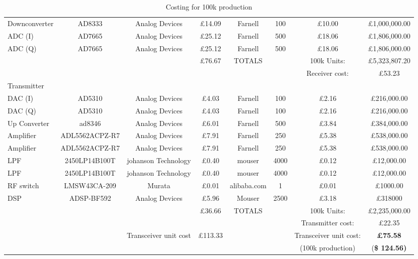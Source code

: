 \begin{sidewaystable}
\begin{tabular}{l c c c c c c c}
Downconverter& AD8333& Analog Devices& \pounds14.09& Farnell& 100& \pounds10.00& \pounds1,000,000.00\\

ADC (I)& AD7665 &Analog Devices& \pounds25.12 &Farnell& 500 &\pounds18.06 &\pounds1,806,000.00\\
ADC (Q)& AD7665 &Analog Devices& \pounds25.12 &Farnell& 500 &\pounds18.06 &\pounds1,806,000.00\\
\midrule %
&&&\pounds76.67 &TOTALS&& 100k Units: &\pounds5,323,807.20\\

&&&&&&Receiver cost:&\pounds53.23\\



Transmitter\\
\midrule
DAC (I)& AD5310 & Analog Devices &\pounds4.03 &Farnell& 100& \pounds 2.16 &\pounds216,000.00\\
DAC (Q)& AD5310 & Analog Devices &\pounds4.03 &Farnell& 100& \pounds 2.16 &\pounds216,000.00\\
Up Converter& ad8346& Analog Devices& \pounds6.01& Farnell& 500& \pounds3.84& \pounds384,000.00\\

Amplifier& ADL5562ACPZ-R7& Analog Devices& \pounds7.91& Farnell& 250& \pounds5.38& \pounds538,000.00\\

Amplifier& ADL5562ACPZ-R7& Analog Devices& \pounds7.91& Farnell& 250& \pounds5.38& \pounds538,000.00\\

LPF& 2450LP14B100T& johanson Technology& \pounds0.40& mouser& 4000& \pounds0.12& \pounds12,000.00\\
LPF& 2450LP14B100T& johanson Technology& \pounds0.40& mouser& 4000& \pounds0.12& \pounds12,000.00\\
\midrule
RF switch& LMSW43CA-209& Murata& \pounds0.01 &alibaba.com &1 &\pounds0.01 &\pounds1000.00\\
DSP&ADSP-BF592	&Analog Devices&	\pounds5.96&	Mouser&	2500&	\pounds3.18&	\pounds318000\\
\midrule

&&&\pounds36.66 & TOTALS && 100k Units:&\pounds2,235,000.00\\
&&&&&&Transmitter cost:&\pounds22.35\\

&&Transceiver unit cost	&\pounds113.33 &&&Transceiver unit cost: & \textbf{\pounds 75.58}\\
&&&&&&(100k production)&(\textbf{\$ 124.56)}\\

\end{tabular}
\caption{Costing for 100k production} %
\label{tab:cost} %
\end{sidewaystable}